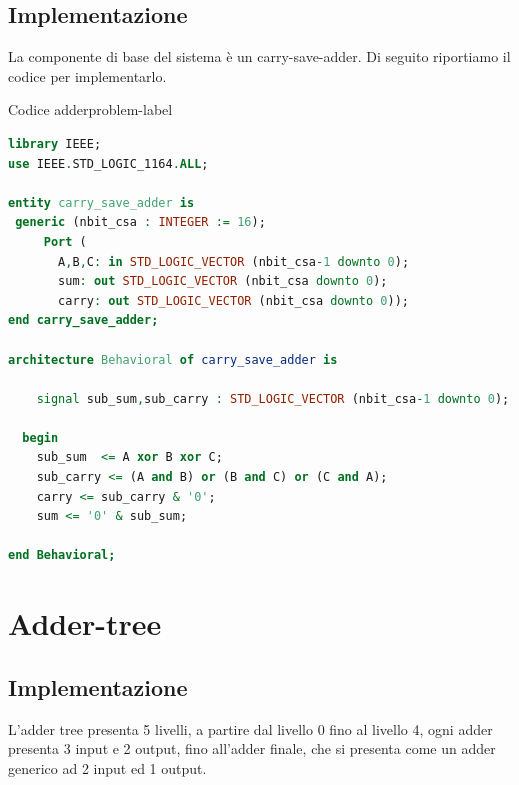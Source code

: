 \subsection{Implementazione}
La componente di base del sistema è un carry-save-adder.
Di seguito riportiamo il codice per implementarlo.

\begin{problem}{Codice adder}{problem-label}
\begin{lstlisting}[language=VHDL]
library IEEE;
use IEEE.STD_LOGIC_1164.ALL;
    
entity carry_save_adder is
 generic (nbit_csa : INTEGER := 16);
     Port ( 
       A,B,C: in STD_LOGIC_VECTOR (nbit_csa-1 downto 0);
       sum: out STD_LOGIC_VECTOR (nbit_csa downto 0);
       carry: out STD_LOGIC_VECTOR (nbit_csa downto 0));
end carry_save_adder;
    
architecture Behavioral of carry_save_adder is

    signal sub_sum,sub_carry : STD_LOGIC_VECTOR (nbit_csa-1 downto 0);
        
  begin
    sub_sum  <= A xor B xor C;
    sub_carry <= (A and B) or (B and C) or (C and A);
    carry <= sub_carry & '0';
    sum <= '0' & sub_sum;
    
end Behavioral;
\end{lstlisting}
\end{problem}

\section{Adder-tree}
\subsection{Implementazione}
L'adder tree presenta 5 livelli, a partire dal livello 0 fino al livello 4, ogni adder presenta 3 input e 2 output, fino all'adder finale, che si presenta come un adder generico ad 2 input ed 1 output.


